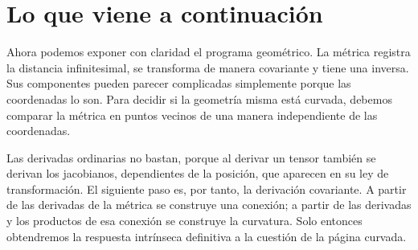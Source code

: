 \begin{classroomqa}
\end{classroomqa}

\begin{classroomqa}
\end{classroomqa}

\section{Lo que viene a continuación}

Ahora podemos exponer con claridad el programa geométrico. La métrica registra la distancia infinitesimal, se transforma de manera covariante y tiene una inversa. Sus componentes pueden parecer complicadas simplemente porque las coordenadas lo son. Para decidir si la geometría misma está curvada, debemos comparar la métrica en puntos vecinos de una manera independiente de las coordenadas.

Las derivadas ordinarias no bastan, porque al derivar un tensor también se derivan los jacobianos, dependientes de la posición, que aparecen en su ley de transformación. El siguiente paso es, por tanto, la derivación covariante. A partir de las derivadas de la métrica se construye una conexión; a partir de las derivadas y los productos de esa conexión se construye la curvatura. Solo entonces obtendremos la respuesta intrínseca definitiva a la cuestión de la página curvada.